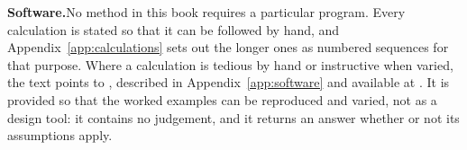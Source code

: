 \noindent\textbf{Software.}\enspace No method in this book requires a
particular program. Every calculation is stated so that it can be followed by
hand, and Appendix~\ref{app:calculations} sets out the longer ones as numbered
sequences for that purpose. Where a calculation is tedious by hand or
instructive when varied, the text points to \companionname, described in
Appendix~\ref{app:software} and available at \companionlink. It is
provided so that the worked examples can be reproduced and varied, not as a
design tool: it contains no judgement, and it returns an answer whether or not
its assumptions apply.
